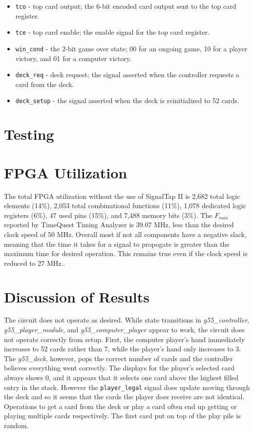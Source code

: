 \documentclass[12pt]{article}
\begin{document}
\begin{enumerate}
\begin{itemize}
\item \texttt{tco} - top card output; the 6-bit encoded card output sent to the top card register.
\item \texttt{tce} - top card enable; the enable signal for the top card register.
\item \texttt{win\_cond} - the 2-bit game over state; 00 for an ongoing game, 10 for a player victory, and 01 for a computer victory.
\item \texttt{deck\_req} - deck request; the signal asserted when the controller requests a card from the deck.
\item \texttt{deck\_setup} - the signal asserted when the deck is reinitialized to 52 cards.
\end{itemize}
\end{enumerate}

\section{Testing}

\section{FPGA Utilization}
The total FPGA utilization without the use of SignalTap II is 2,682 total logic elements (14\%), 2,053 total combinational functions (11\%), 1,078 dedicated logic registers (6\%), 47 used pins (15\%), and 7,488 memory bits (3\%). The $F_{max}$ reported by TimeQuest Timing Analyzer is 39.07 MHz, less than the desired clock speed of 50 MHz. Overall most if not all components have a negative slack, meaning that the time it takes for a signal to propogate is greater than the maximum time for desired operation. This remains true even if the clock speed is reduced to 27 MHz..

\section{Discussion of Results}
The circuit does not operate as desired. While state transitions in \textit{g55\_controller}, \textit{g55\_player\_module}, and \textit{g55\_computer\_player} appear to work, the circuit does not operate correctly from setup. First, the computer player's hand immediately increases to 52 cards rather than 7, while the player's hand only increases to 3. The \textit{g55\_deck}, however, pops the correct number of cards and the controller believes everything went correctly. The displays for the player's selected card always shows 0, and it appears that it selects one card above the highest filled entry in the stack. However the \texttt{player\_legal} signal does update moving through the deck and so it seems that the cards the player does receive are not identical. Operations to get a card from the deck or play a card often end up getting or playing multiple cards respectively. The first card put on top of the play pile is random. \\
\end{document}
